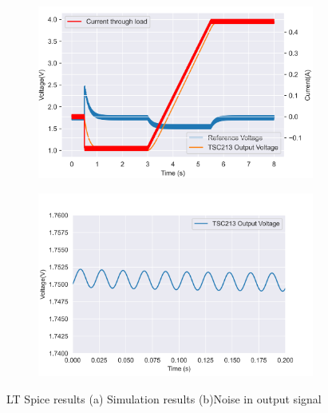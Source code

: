  \begin{figure}[!htb]
 \footnotesize
 \centering
    \begin{subfigure}[]{0.48\textwidth}
              \centering
  		\includegraphics[width=1\linewidth]{./Figures/circuit.png}
		    \caption{} \label{subfig:sim}
     \end{subfigure}
     \begin{subfigure}[]{0.5\textwidth}
             \centering
  		\includegraphics[width=1\linewidth]{./Figures/noise.png}
		   \caption{ } \label{subfig:noise}
     \end{subfigure}
   \caption[{Spice}]{LT Spice results   (a)  Simulation results (b)Noise in output signal }
 
 \end{figure}


